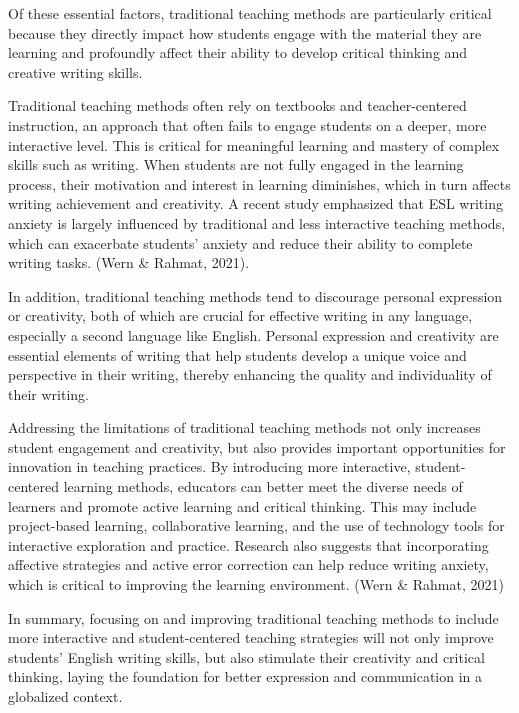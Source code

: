 \documentclass[11pt]{article}
\begin{document}
Of these essential factors, traditional teaching methods are particularly critical because they directly impact how students engage with the material they are learning and profoundly affect their ability to develop critical thinking and creative writing skills.

Traditional teaching methods often rely on textbooks and teacher-centered instruction, an approach that often fails to engage students on a deeper, more interactive level. This is critical for meaningful learning and mastery of complex skills such as writing. When students are not fully engaged in the learning process, their motivation and interest in learning diminishes, which in turn affects writing achievement and creativity. A recent study emphasized that ESL writing anxiety is largely influenced by traditional and less interactive teaching methods, which can exacerbate students' anxiety and reduce their ability to complete writing tasks. (Wern \& Rahmat, 2021).

In addition, traditional teaching methods tend to discourage personal expression or creativity, both of which are crucial for effective writing in any language, especially a second language like English. Personal expression and creativity are essential elements of writing that help students develop a unique voice and perspective in their writing, thereby enhancing the quality and individuality of their writing.

Addressing the limitations of traditional teaching methods not only increases student engagement and creativity, but also provides important opportunities for innovation in teaching practices. By introducing more interactive, student-centered learning methods, educators can better meet the diverse needs of learners and promote active learning and critical thinking. This may include project-based learning, collaborative learning, and the use of technology tools for interactive exploration and practice. Research also suggests that incorporating affective strategies and active error correction can help reduce writing anxiety, which is critical to improving the learning environment. (Wern \& Rahmat, 2021)

In summary, focusing on and improving traditional teaching methods to include more interactive and student-centered teaching strategies will not only improve students' English writing skills, but also stimulate their creativity and critical thinking, laying the foundation for better expression and communication in a globalized context.
\end{document}
